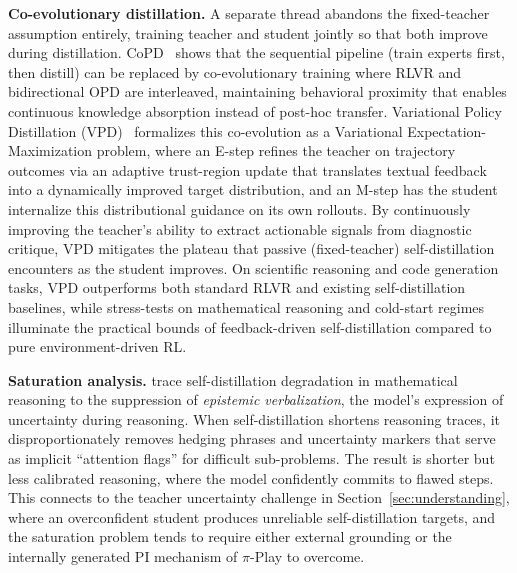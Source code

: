 \documentclass{article} %
\begin{document}
\textbf{Co-evolutionary distillation.} A separate thread abandons the fixed-teacher assumption entirely, training teacher and student jointly so that both improve during distillation. CoPD~\citep{2604.27083} shows that the sequential pipeline (train experts first, then distill) can be replaced by co-evolutionary training where RLVR and bidirectional OPD are interleaved, maintaining behavioral proximity that enables continuous knowledge absorption instead of post-hoc transfer. Variational Policy Distillation (VPD)~\citep{2605.15113} formalizes this co-evolution as a Variational Expectation-Maximization problem, where an E-step refines the teacher on trajectory outcomes via an adaptive trust-region update that translates textual feedback into a dynamically improved target distribution, and an M-step has the student internalize this distributional guidance on its own rollouts. By continuously improving the teacher's ability to extract actionable signals from diagnostic critique, VPD mitigates the plateau that passive (fixed-teacher) self-distillation encounters as the student improves. On scientific reasoning and code generation tasks, VPD outperforms both standard RLVR and existing self-distillation baselines, while stress-tests on mathematical reasoning and cold-start regimes illuminate the practical bounds of feedback-driven self-distillation compared to pure environment-driven RL.

\textbf{Saturation analysis.} \citet{2603.24472} trace self-distillation degradation in mathematical reasoning to the suppression of \emph{epistemic verbalization}, the model's expression of uncertainty during reasoning. When self-distillation shortens reasoning traces, it disproportionately removes hedging phrases and uncertainty markers that serve as implicit ``attention flags'' for difficult sub-problems. The result is shorter but less calibrated reasoning, where the model confidently commits to flawed steps. This connects to the teacher uncertainty challenge in Section~\ref{sec:understanding}, where an overconfident student produces unreliable self-distillation targets, and the saturation problem tends to require either external grounding or the internally generated PI mechanism of $\pi$-Play to overcome.
\end{document}
